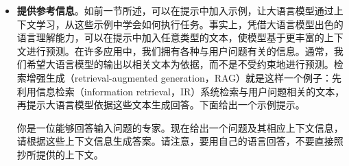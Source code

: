 \begin{itemize}
    这样就得到了问题的初步答案。第二步，再提示大语言模型评估答案是否正确，必要时重新求解，以得到更好的解答。

    \vspace{0.5em}
    \begin{tcolorbox}

    \begingroup
    \setlength{\leftskip}{2em}
    \setlength{\rightskip}{2em}

    下面将给出一道数学题及其解答。请评估解答是否正确，若存在错误，请指出。然后给出你自己的解答。

    \vspace{0.3em}

    题目：$\{*\mathrm{problem}*\}$

    \vspace{0.5em}

    解答：$\{*\mathrm{solution}*\}$

    \underline{\hspace{2em}}

    \endgroup

    \end{tcolorbox}
    \vspace{0.5em}

    这里给出的提示与大语言模型推理问题领域的一系列长期研究密切相关。由于这一主题涵盖大量方法，无法在此完整讨论所有相关问题。第~\ref{sec:advanced-prompting} 节将较为详细地讨论如何通过更多推理来改进提示。

\item \vspace{0.3em} \textbf{提供参考信息}。如前一节所述，可以在提示中加入示例，让大语言模型通过上下文学习，从这些示例中学会如何执行任务。事实上，凭借大语言模型出色的语言理解能力，可以在提示中加入任意类型的文本，使模型基于更丰富的上下文进行预测。在许多应用中，我们拥有各种与用户问题有关的信息。通常，我们希望大语言模型的输出以相关文本为依据，而不是不受约束地进行预测。检索增强生成（retrieval-augmented generation，RAG）就是这样一个例子：先利用信息检索（information retrieval，IR）系统检索与用户问题相关的文本，再提示大语言模型依据这些文本生成回答。下面给出一个示例提示。

    \vspace{0.5em}
    \begin{tcolorbox}

    \begingroup
    \setlength{\leftskip}{2em}
    \setlength{\rightskip}{2em}

    你是一位能够回答输入问题的专家。现在给出一个问题及其相应上下文信息，请根据这些上下文信息生成答案。请注意，要用自己的语言回答，不要直接照抄所提供的上下文。


\end{tcolorbox}
\end{itemize}
